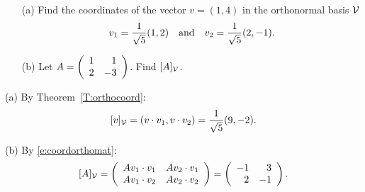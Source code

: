 \documentclass{ximera}
\begin{document}
\begin{exercise} \label{c7.4.2}
\begin{itemize}
\item[(a)] Find the coordinates of the vector $v=(1,4)$ in the orthonormal
basis ${\cal V}$
\[
v_1 = \frac{1}{\sqrt{5}}(1,2) \quad\mbox{and}\quad v_2 = \frac{1}{\sqrt{5}}(2,-1).
\]
\item[(b)]  Let $A=\left(\begin{array}{rr} 1 & 1\\ 2 &-3\end{array}\right)$. Find $[A]_{\cal V}$.
\end{itemize}

\begin{solution}
\soln
(a) By Theorem~\ref{T:orthocoord}:
\[
[v]_{\cal V} = (v \cdot v_1, v \cdot v_2) = 
\frac{1}{\sqrt{5}}(9,-2).
\]

(b) By \eqref{e:coordorthomat}:
\[ [A]_{\cal V} = \left(\begin{array}{rr} Av_1 \cdot v_1 & Av_2 \cdot v_1\\ Av_1 \cdot v_2 &Av_2 \cdot v_2\end{array}\right) = \left(\begin{array}{rr} -1 & 3\\ 2 &-1\end{array}\right). \]

\end{solution}
\end{exercise}
\end{document}
